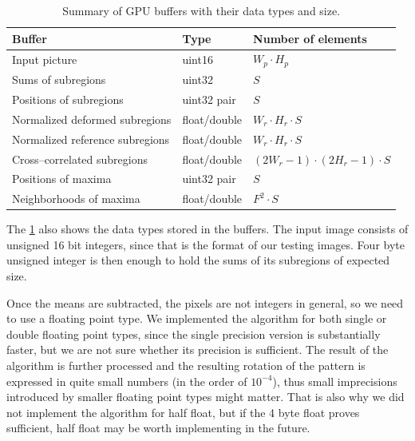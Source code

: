 \begin{table}[]
	\begin{tabular}{@{}lll@{}}
		\toprule
		Buffer                          & Type         & Number of elements             \\ \midrule
		Input picture                   & uint16       & $W_p \cdot H_p$                \\
		Sums of subregions              & uint32       & $S$                            \\
		Positions of subregions         & uint32 pair  & $S$                            \\
		Normalized deformed subregions  & float/double & $W_r \cdot H_r \cdot S$        \\
		Normalized reference subregions & float/double & $W_r \cdot H_r \cdot S$        \\
		Cross--correlated subregions    & float/double & $(2W_r-1)\cdot(2H_r-1)\cdot S$ \\
		Positions of maxima             & uint32 pair  & $S$                            \\
		Neighborhoods of maxima         & float/double & $F^2 \cdot S $                 \\ \bottomrule
	\end{tabular}
	\caption{Summary of GPU buffers with their data types and size.}
	\label{buftypes}
\end{table}



The \cref{buftypes} also shows the data types stored in the buffers. The input image consists of unsigned 16 bit integers, since that is the format of our testing images. Four byte unsigned integer is then enough to hold the sums of its subregions of expected size.

Once the means are subtracted, the pixels are not integers in general, so we need to use a floating point type. We implemented the algorithm for both single or double floating point types, since the single precision version is substantially faster, but we are not sure whether its precision is sufficient. The result of the algorithm is further processed and the resulting rotation of the pattern is expressed in quite small numbers (in the order of $10^{-4}$), thus small imprecisions introduced by smaller floating point types might matter. That is also why we did not implement the algorithm for half float, but if the 4 byte float proves sufficient, half float may be worth implementing in the future.

